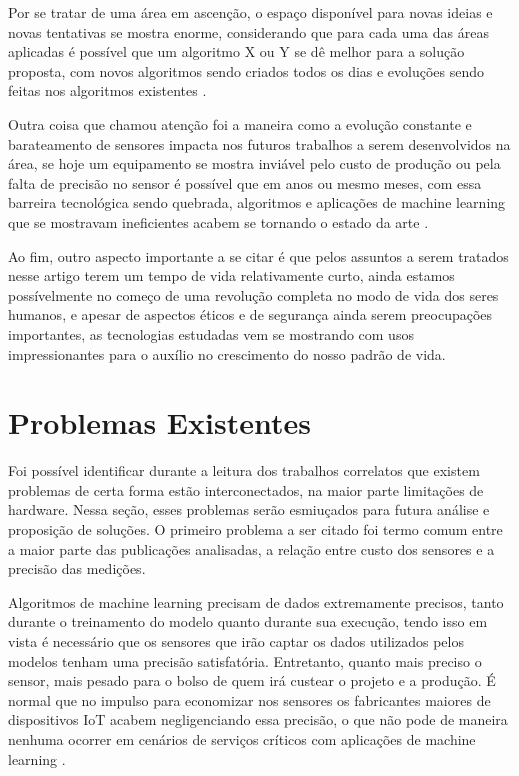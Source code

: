 \documentclass[12pt]{article}
\begin{document}
Por se tratar de uma área em ascenção, o espaço disponível para novas ideias e novas tentativas se mostra enorme, considerando que para cada uma das áreas aplicadas é possível que um algoritmo X ou Y se dê melhor para a solução proposta, com novos algoritmos sendo criados todos os dias e evoluções sendo feitas nos algoritmos existentes \cite{hameed}.

Outra coisa que chamou atenção foi a maneira como a evolução constante e barateamento de sensores impacta nos futuros trabalhos a serem desenvolvidos na área, se hoje um equipamento se mostra inviável pelo custo de produção ou pela falta de precisão no sensor é possível que em anos ou mesmo meses, com essa barreira tecnológica sendo quebrada, algoritmos e aplicações de machine learning que se mostravam ineficientes acabem se tornando o estado da arte \cite{sacco} \cite{ali}.

Ao fim, outro aspecto importante a se citar é que pelos assuntos a serem tratados nesse artigo terem um tempo de vida relativamente curto, ainda estamos possívelmente no começo de uma revolução completa no modo de vida dos seres humanos, e apesar de aspectos éticos e de segurança ainda serem preocupações importantes, as tecnologias estudadas vem se mostrando com usos impressionantes para o auxílio no crescimento do nosso padrão de vida.

\section{Problemas Existentes}

Foi possível identificar durante a leitura dos trabalhos correlatos que existem problemas de certa forma estão interconectados, na maior parte limitações de hardware. Nessa seção, esses problemas serão esmiuçados para futura análise e proposição de soluções. O primeiro problema a ser citado foi termo comum entre a maior parte das publicações analisadas, a relação entre custo dos sensores e a precisão das medições.

Algoritmos de machine learning precisam de dados extremamente precisos, tanto durante o treinamento do modelo quanto durante sua execução, tendo isso em vista é necessário que os sensores que irão captar os dados utilizados pelos modelos tenham uma precisão satisfatória. Entretanto, quanto mais preciso o sensor, mais pesado para o bolso de quem irá custear o projeto e a produção. É normal que no impulso para economizar nos sensores os fabricantes maiores de dispositivos IoT acabem negligenciando essa precisão, o que não pode de maneira nenhuma ocorrer em cenários de serviços críticos com aplicações de machine learning \cite{sacco}.
\end{document}

